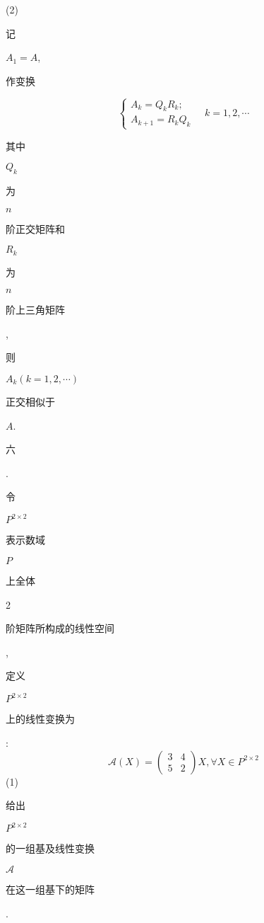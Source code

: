 \documentclass[10pt]{article}
\begin{document}
(2) \begin{CJK}{UTF8}{mj}记\end{CJK} $A_{1}=A$, \begin{CJK}{UTF8}{mj}作变换\end{CJK}
$$
\left\{\begin{array}{l}
A_{k}=Q_{k} R_{k} ; \\
A_{k+1}=R_{k} Q_{k}
\end{array} \quad k=1,2, \cdots\right.
$$
\begin{CJK}{UTF8}{mj}其中\end{CJK} $Q_{k}$ \begin{CJK}{UTF8}{mj}为\end{CJK} $n$ \begin{CJK}{UTF8}{mj}阶正交矩阵和\end{CJK} $R_{k}$ \begin{CJK}{UTF8}{mj}为\end{CJK} $n$ \begin{CJK}{UTF8}{mj}阶上三角矩阵\end{CJK}, \begin{CJK}{UTF8}{mj}则\end{CJK} $A_{k}(k=1,2, \cdots)$ \begin{CJK}{UTF8}{mj}正交相似于\end{CJK} $A$.

\begin{CJK}{UTF8}{mj}六\end{CJK}. \begin{CJK}{UTF8}{mj}令\end{CJK} $P^{2 \times 2}$ \begin{CJK}{UTF8}{mj}表示数域\end{CJK} $P$ \begin{CJK}{UTF8}{mj}上全体\end{CJK} 2 \begin{CJK}{UTF8}{mj}阶矩阵所构成的线性空间\end{CJK}, \begin{CJK}{UTF8}{mj}定义\end{CJK} $P^{2 \times 2}$ \begin{CJK}{UTF8}{mj}上的线性变换为\end{CJK}:
$$
\mathscr{A}(X)=\left(\begin{array}{ll}
3 & 4 \\
5 & 2
\end{array}\right) X, \forall X \in P^{2 \times 2}
$$
(1) \begin{CJK}{UTF8}{mj}给出\end{CJK} $P^{2 \times 2}$ \begin{CJK}{UTF8}{mj}的一组基及线性变换\end{CJK} $\mathscr{A}$ \begin{CJK}{UTF8}{mj}在这一组基下的矩阵\end{CJK}.
\end{document}
